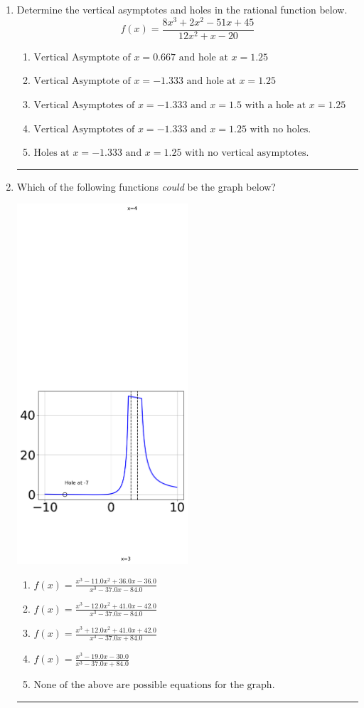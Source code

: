 \documentclass[14pt]{extbook}
\newcommand{\litem}[1]{\item#1\hspace*{-1cm}\rule{\textwidth}{0.4pt}}
\begin{document}
\begin{enumerate}
{\begin{enumerate}[label=\Alph*.]
\end{enumerate} }
\litem{
Determine the vertical asymptotes and holes in the rational function below.\[ f(x) = \frac{8x^{3} +2 x^{2} -51 x + 45}{12x^{2} +x -20} \]\begin{enumerate}[label=\Alph*.]
\item \( \text{Vertical Asymptote of } x = 0.667 \text{ and hole at } x = 1.25 \)
\item \( \text{Vertical Asymptote of } x = -1.333 \text{ and hole at } x = 1.25 \)
\item \( \text{Vertical Asymptotes of } x = -1.333 \text{ and } x = 1.5 \text{ with a hole at } x = 1.25 \)
\item \( \text{Vertical Asymptotes of } x = -1.333 \text{ and } x = 1.25 \text{ with no holes.} \)
\item \( \text{Holes at } x = -1.333 \text{ and } x = 1.25 \text{ with no vertical asymptotes.} \)

\end{enumerate} }
\litem{
Which of the following functions \textit{could} be the graph below?
\begin{center}
    \includegraphics[width=0.5\textwidth]{../Figures/identifyGraphOfRationalFunctionCopyC.png}
\end{center}
\begin{enumerate}[label=\Alph*.]
\item \( f(x)=\frac{x^{3} -11.0 x^{2} +36.0 x -36.0}{x^{3} -37.0 x -84.0} \)
\item \( f(x)=\frac{x^{3} -12.0 x^{2} +41.0 x -42.0}{x^{3} -37.0 x -84.0} \)
\item \( f(x)=\frac{x^{3} +12.0 x^{2} +41.0 x + 42.0}{x^{3} -37.0 x + 84.0} \)
\item \( f(x)=\frac{x^{3} -19.0 x -30.0}{x^{3} -37.0 x + 84.0} \)
\item \( \text{None of the above are possible equations for the graph.} \)


\end{enumerate}}
\end{enumerate}
\end{document}
